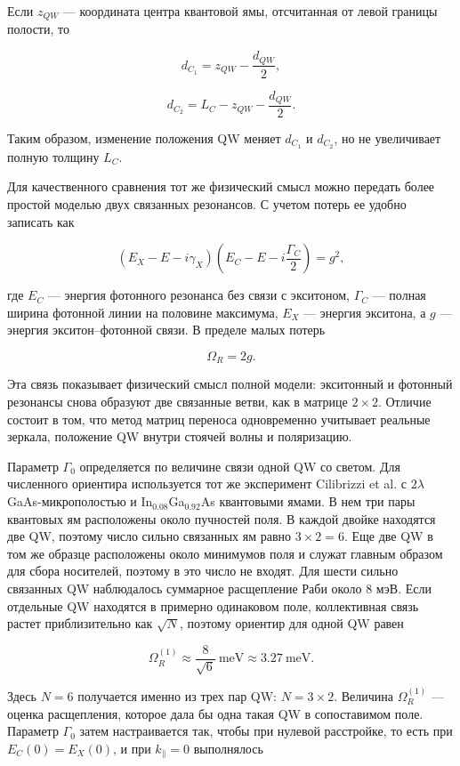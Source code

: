 \documentclass[12pt,a4paper]{article}
\begin{document}
Если $z_{QW}$ --- координата центра квантовой ямы, отсчитанная от левой границы полости, то

\[
d_{C_1}=z_{QW}-\frac{d_{QW}}{2},
\]

\[
d_{C_2}=L_C-z_{QW}-\frac{d_{QW}}{2}.
\]

Таким образом, изменение положения QW меняет $d_{C_1}$ и $d_{C_2}$, но не увеличивает полную толщину $L_C$.

Для качественного сравнения тот же физический смысл можно передать более простой моделью двух связанных резонансов. С учетом потерь ее удобно записать как

\[
\left(E_X-E-i\gamma_X\right)
\left(E_C-E-i\frac{\Gamma_C}{2}\right)
=g^2,
\]

где $E_C$ --- энергия фотонного резонанса без связи с экситоном, $\Gamma_C$ --- полная ширина фотонной линии на половине максимума, $E_X$ --- энергия экситона, а $g$ --- энергия экситон--фотонной связи. В пределе малых потерь

\[
\Omega_R=2g.
\]

Эта связь показывает физический смысл полной модели: экситонный и фотонный резонансы снова образуют две связанные ветви, как в матрице $2\times2$. Отличие состоит в том, что метод матриц переноса одновременно учитывает реальные зеркала, положение QW внутри стоячей волны и поляризацию.

Параметр $\Gamma_0$ определяется по величине связи одной QW со светом. Для численного ориентира используется тот же эксперимент Cilibrizzi et al. с $2\lambda$ GaAs-микрополостью и In$_{0.08}$Ga$_{0.92}$As квантовыми ямами. В нем три пары квантовых ям расположены около пучностей поля. В каждой двойке находятся две QW, поэтому число сильно связанных ям равно $3\times2=6$. Еще две QW в том же образце расположены около минимумов поля и служат главным образом для сбора носителей, поэтому в это число не входят. Для шести сильно связанных QW наблюдалось суммарное расщепление Раби около $8$ мэВ. Если отдельные QW находятся в примерно одинаковом поле, коллективная связь растет приблизительно как $\sqrt{N}$, поэтому ориентир для одной QW равен

\[
\Omega_R^{(1)}
\approx
\frac{8}{\sqrt{6}}\ \mathrm{meV}
\approx3.27\ \mathrm{meV}.
\]

Здесь $N=6$ получается именно из трех пар QW: $N=3\times2$. Величина $\Omega_R^{(1)}$ --- оценка расщепления, которое дала бы одна такая QW в сопоставимом поле. Параметр $\Gamma_0$ затем настраивается так, чтобы при нулевой расстройке, то есть при $E_C(0)=E_X(0)$, и при $k_\parallel=0$ выполнялось
\end{document}
